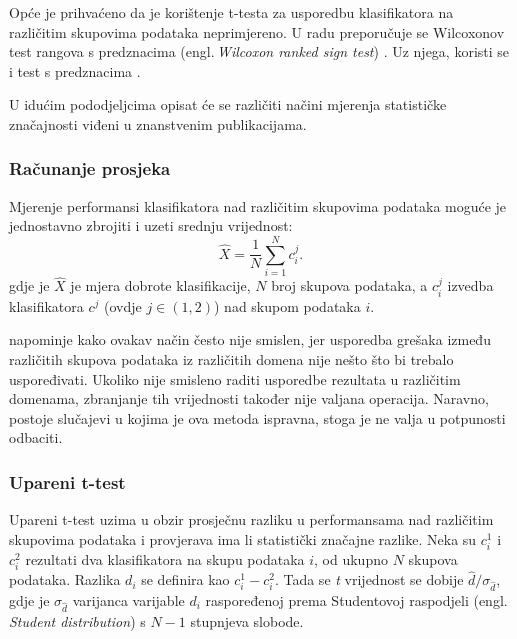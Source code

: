 Opće je prihvaćeno da je korištenje t-testa za usporedbu klasifikatora na različitim skupovima podataka neprimjereno. U radu \citep{demvsar2006statistical} preporučuje se Wilcoxonov test rangova s predznacima (engl.\,\textit{Wilcoxon ranked sign test}) \citep{wilcoxon1945individual}. Uz njega, koristi se i test s predznacima \cite{dixon1946statistical}. 

U idućim pododjeljcima opisat će se različiti načini mjerenja statističke značajnosti viđeni u znanstvenim publikacijama.

\subsubsection{Računanje prosjeka}

Mjerenje performansi klasifikatora nad različitim skupovima podataka moguće je jednostavno zbrojiti i uzeti srednju vrijednost:
\begin{equation}
\hat{X} = \frac{1}{N} \sum^{N}_{i = 1} c_{i}^{j}. 
\end{equation}
gdje je $\hat{X}$ je mjera dobrote klasifikacije, $N$ broj skupova podataka, a $c_{i}^{j}$ izvedba klasifikatora $c^j$ (ovdje $j\in (1,2)$) nad skupom podataka $i$.

\citep{webb2000multiboosting} napominje kako ovakav način često nije smislen, jer usporedba grešaka između različitih skupova podataka iz različitih domena nije nešto što bi trebalo uspoređivati. Ukoliko nije smisleno raditi usporedbe rezultata u različitim domenama, zbranjanje tih vrijednosti također nije valjana operacija. Naravno, postoje slučajevi u kojima je ova metoda ispravna, stoga je ne valja u potpunosti odbaciti.

\subsubsection{Upareni t-test}

Upareni t-test \citep{sprinthall1990basic} uzima u obzir prosječnu razliku u performansama nad različitim skupovima podataka i provjerava ima li statistički značajne razlike. Neka su $c^{1}_{i}$ i $c^{2}_{i}$ rezultati dva klasifikatora na skupu podataka $i$, od ukupno $N$ skupova podataka. Razlika $d_i$ se definira kao $c^{1}_{i} - c^{2}_{i}$. Tada se \textit{t} vrijednost se dobije $\hat{d}/\sigma_{\hat{d}}$, gdje je $\sigma_ {\hat{d}}$ varijanca varijable $d_i$ raspoređenoj prema Studentovoj raspodjeli (engl.\,\textit{Student distribution}) s $N-1$ stupnjeva slobode. 

